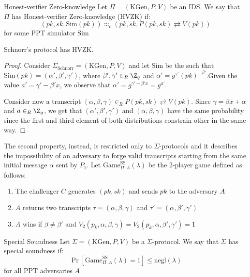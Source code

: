 \documentclass[a4paper, 12pt]{report}
\begin{document}
    \begin{frameddefn}{Honest-verifier Zero-knowledge}
        Let $\Pi = (\mathrm{KGen}, P, V)$ be an IDS. We say that $\Pi$ has Honest-verifier Zero-knowledge (HVZK) if:
        \[(pk, sk, \mathrm{Sim}(pk)) \approx_c (pk,sk, P(pk,sk) \rightleftarrows V(pk))\]
        for some PPT simulator $\mathrm{Sim}$
    \end{frameddefn}

    \begin{framedprop}{}
        Schnorr's protocol has HVZK.
    \end{framedprop}

    \begin{proof}
        Consider $\Sigma_{\text{Schnorr}} = (\mathrm{KGen}, P, V)$ and let $\mathrm{Sim}$ be the such that $\mathrm{Sim}(pk) = (\alpha', \beta', \gamma')$, where $\beta',\gamma' \in_R \Z_q$ and $\alpha' = g^{\gamma'} (pk)^{-\beta'}$.Given the value $a'= \gamma'-\beta' x$, we observe that $\alpha' =  g^{\gamma'-\beta' x} = g^{a'}$.
        
        Consider now a transcript $(\alpha, \beta, \gamma) \in_R P(pk,sk) \rightleftarrows V(pk)$. Since $\gamma = \beta x + \alpha$ and $a \in_R \Z_q$, we get that $(\alpha', \beta', \gamma')$ and $(\alpha, \beta, \gamma)$ have the same probability since the first and third element of both distributions constrain other in the same way.
    \end{proof}

    The second property, instead, is restricted only to $\Sigma$-protocols and it describes the impossibility of an adversary to forge valid transcripts starting from the same initial message $\alpha$ sent by $P_1$. Let $\mathrm{Game}_{\Pi, A}^{\text{SS}}(\lambda)$ be the 2-player game defined as follows:
    \begin{enumerate}
        \item The challenger $C$ generates $(pk, sk)$ and sends $pk$ to the adversary $A$
        \item $A$ returns two transcripts $\tau = (\alpha, \beta, \gamma)$ and $\tau' = (\alpha, \beta', \gamma')$
        \item $A$ wins if $\beta \neq \beta'$ and $V_2(p_k, \alpha, \beta, \gamma) = V_2(p_k, \alpha, \beta', \gamma') = 1$
    \end{enumerate}

    \begin{frameddefn}{Special Soundness}
        Let $\Sigma = (\mathrm{KGen}, P, V)$ be a $\Sigma$-protocol. We say that $\Sigma$ has special soundness if:
        \[\Pr[\mathrm{Game}_{\Pi, A}^{\text{SS}}(\lambda) = 1] \leq \mathrm{negl}(\lambda)\]
        for all PPT adversaries $A$
    \end{frameddefn}
\end{document}
